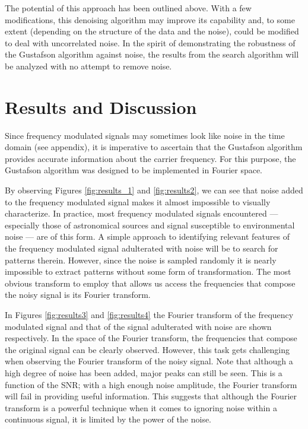 \documentclass[onecolumn, groupedaddress, 10pt]{revtex4-1}
\begin{document}
The potential of this approach has been outlined above. With a few modifications, this denoising algorithm may improve its capability and, to some extent (depending on the structure of the data and the noise), could be modified to deal with uncorrelated noise. In the spirit of demonstrating the robustness of the Gustafson algorithm against noise, the results from the search algorithm will be analyzed with no attempt to remove noise.

\section{Results and Discussion}
Since frequency modulated signals may sometimes look like noise in the time domain (see appendix), it is imperative to ascertain that the Gustafson algorithm provides accurate information about the carrier frequency. For this purpose, the Gustafson algorithm was designed to be implemented in Fourier space.

By observing Figures \ref{fig:results_1} and \ref{fig:results2}, we can see that noise added to the frequency modulated signal makes it almost impossible to visually characterize. In practice, most frequency modulated signals encountered --- especially those of astronomical sources and signal susceptible to environmental noise --- are of this form. A simple approach to identifying relevant features of the frequency modulated signal adulterated with noise will be to search for patterns therein. However, since the noise is sampled randomly it is nearly impossible to extract patterns without some form of transformation. The most obvious transform to employ that allows us access the frequencies that compose the noisy signal is its Fourier transform.

In Figures \ref{fig:results3} and \ref{fig:results4} the Fourier transform of the frequency modulated signal and that of the signal adulterated with noise are shown respectively. In the space of the Fourier transform, the frequencies that compose the original signal can be clearly observed. However, this task gets challenging when observing the Fourier transform of the noisy signal. Note that although a high degree of noise has been added, major peaks can still be seen. This is a function of the SNR; with a high enough noise amplitude, the Fourier transform will fail in providing useful information. This suggests that although the Fourier transform is a powerful technique when it comes to ignoring noise within a continuous signal, it is limited by the power of the noise.
\end{document}
